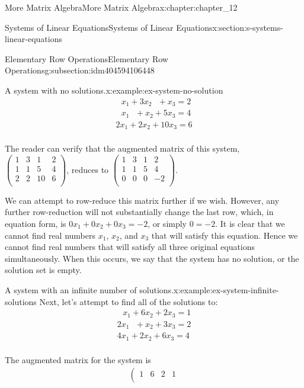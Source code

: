 \documentclass[twoside,10pt,]{book}
\numberwithin{equation}{section}
\begin{document}
\begin{chapterptx}{More Matrix Algebra}{}{More Matrix Algebra}{}{}{x:chapter:chapter_12}
\begin{sectionptx}{Systems of Linear Equations}{}{Systems of Linear Equations}{}{}{x:section:s-systems-linear-equations}
\begin{subsectionptx}{Elementary Row Operations}{}{Elementary Row Operations}{}{}{g:subsection:idm404594106448}
\begin{example}{A system with no solutions.}{x:example:ex-system-no-solution}
\begin{equation*}
\begin{array}{l}
\text{   }x_1 +3 x_2\text{    }+x_3=2 \\
\text{    }x_1\text{   }+x_2 +5 x_3=4 \\
2 x_1+2 x_2+10 x_3=6 \\
\end{array}
\end{equation*}
%
\par
The reader can verify that the augmented matrix of this system, \(\left(
\begin{array}{ccc|c}
1 & 3 & 1 & 2 \\
1 & 1 & 5 & 4 \\
2 & 2 & 10 & 6 \\
\end{array}
\right)\), reduces to \(\left(
\begin{array}{ccc|c}
1 & 3 & 1 & 2 \\
1 & 1 & 5 & 4 \\
0 & 0 & 0 & -2 \\
\end{array}
\right)\).%
\par
We can attempt to row-reduce this matrix further if we wish. However, any further row-reduction will not substantially change the last row, which, in equation form, is \(0x_1+ 0x_2+0x_3 = -2\), or simply \(0=-2\). It is clear that we cannot find real numbers \(x_1\), \(x_2\), and \(x_3\) that will satisfy this equation. Hence we cannot find real numbers that will satisfy all three original equations simultaneously. When this occurs, we say that the system has no solution, or the solution set is empty.%
\end{example}
\begin{example}{A system with an infinite number of solutions.}{x:example:ex-system-infinite-solutions}%
Next, let's attempt to find all of the solutions to:%
\begin{equation*}
\begin{array}{l}
\text{   }x_1+6 x_2+2 x_3=1 \\
2 x_1\text{   }+x_2+3 x_3 =2 \\
4 x_1+2 x_2+6 x_3=4 \\
\end{array}
\end{equation*}
%
\par
The augmented matrix for the system is%
\begin{align}
\left(
\begin{array}{ccc|c}
1 & 6 & 2 & 1 \\

\end{array}
\end{align}
\end{example}
\end{subsectionptx}
\end{sectionptx}
\end{chapterptx}
\end{document}
